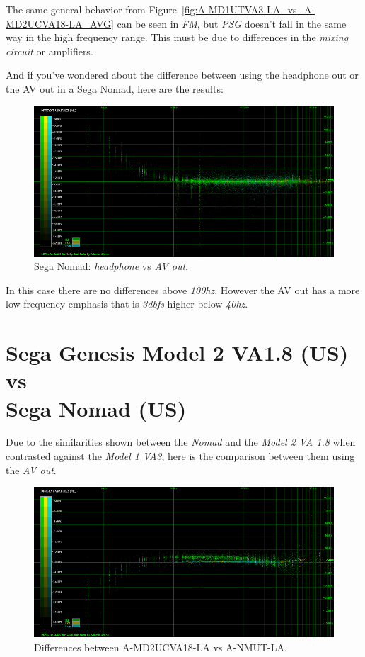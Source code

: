 \documentclass[10pt,a4paper]{report}
\newcommand{\hz}[1]{\textit{\mbox{#1\acrshort{hz}}}}
\newcommand{\db}[1]{\textit{\mbox{#1\acrshort{dbfs}}}}
\begin{document}
The same general behavior from Figure~\ref{fig:A-MD1UTVA3-LA_vs_A-MD2UCVA18-LA_AVG} can be seen in \textit{FM}, but \textit{PSG} doesn't fall in the same way in the high frequency range. This must be due to differences in the \textit{mixing circuit} or amplifiers.

And if you've wondered about the difference between using the headphone out or the AV out in a Sega Nomad, here are the results:

\begin{figure}[H]
	\centering
	\includegraphics[width=1.0\linewidth]{images/results/6-A-NMUT-LA_vs_A-NMUT-AV-LA.png}
	\caption[A-NMUT-LA vs A-NMUT-AV-LA]{Sega Nomad: \textit{headphone} vs \textit{AV out}.}
	\label{fig:A-NMUT-LA_vs_A-NMUT-AV-LA}
\end{figure}

In this case there are no differences above \hz{100}. However the AV out has a more low frequency emphasis that is \db{3} higher below \hz{40}.

\section{Sega Genesis Model 2 VA1.8 (US) vs\\ Sega Nomad (US)}

Due to the similarities shown between the \textit{Nomad} and the \textit{Model 2 VA 1.8} when contrasted against the \textit{Model 1 VA3}, here is the comparison between them using the \textit{AV out}.

\begin{figure}[H]
	\centering
	\includegraphics[width=1.0\linewidth]{images/results/7-A-MD2UCVA18-LA_vs_A-NMUT-LA.png}
	\caption[9-A-MD2UCVA18-LA vs A-NMUT-LA]{Differences between A-MD2UCVA18-LA vs A-NMUT-LA.}
	\label{fig:A-MD2UCVA18-LA_vs_A-NMUT-LA}
\end{figure}
\end{document}
